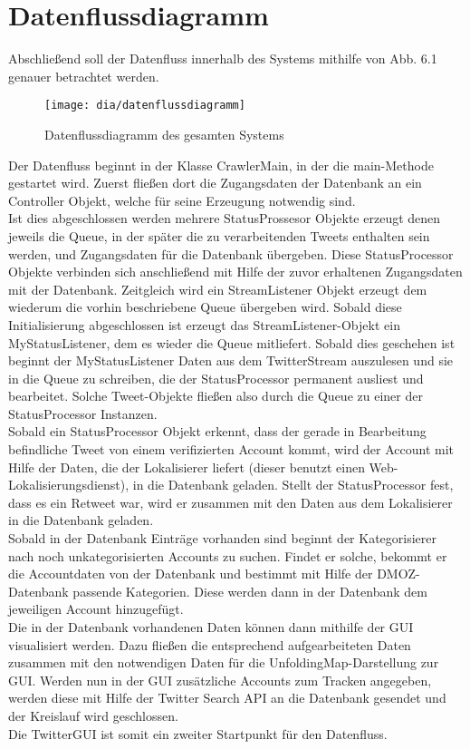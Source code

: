 \section{Datenflussdiagramm}
Abschließend soll der Datenfluss innerhalb des Systems mithilfe von Abb. 6.1 genauer betrachtet werden.

\begin{figure}[h!]
	\centering
	\texttt{[image: dia/datenflussdiagramm]}
	\caption{Datenflussdiagramm des gesamten Systems}
	\label{fig:datenflussdiagramm}
\end{figure}
Der Datenfluss beginnt in der Klasse CrawlerMain, in der die main-Methode gestartet wird. Zuerst fließen dort die Zugangsdaten der Datenbank an ein Controller Objekt, welche für seine Erzeugung notwendig sind. \\
Ist dies abgeschlossen werden mehrere StatusProssesor Objekte erzeugt denen jeweils die Queue, in der später die zu verarbeitenden Tweets enthalten sein werden, und Zugangsdaten für die Datenbank übergeben. Diese StatusProcessor Objekte verbinden sich anschließend mit Hilfe der zuvor erhaltenen Zugangsdaten mit der Datenbank. Zeitgleich wird ein StreamListener Objekt erzeugt dem wiederum die vorhin beschriebene Queue übergeben wird. Sobald diese Initialisierung abgeschlossen ist erzeugt das StreamListener-Objekt ein MyStatusListener, dem es wieder die Queue mitliefert. Sobald dies geschehen ist beginnt der MyStatusListener Daten aus dem TwitterStream auszulesen und sie in die Queue zu schreiben, die der StatusProcessor permanent ausliest und bearbeitet. Solche Tweet-Objekte fließen also durch die Queue zu einer der StatusProcessor Instanzen. \\
Sobald ein StatusProcessor Objekt erkennt, dass der gerade in Bearbeitung befindliche Tweet von einem verifizierten Account kommt, wird der Account mit Hilfe der Daten, die  der Lokalisierer liefert (dieser benutzt einen Web-Lokalisierungsdienst), in die Datenbank geladen. Stellt der StatusProcessor fest, dass es ein Retweet war, wird er zusammen mit den Daten aus dem Lokalisierer in die Datenbank geladen.\\
Sobald in der Datenbank Einträge vorhanden sind beginnt der Kategorisierer nach noch unkategorisierten Accounts zu suchen. Findet er solche, bekommt er die Accountdaten von der Datenbank und bestimmt mit Hilfe der DMOZ-Datenbank passende Kategorien. Diese werden dann in der Datenbank dem jeweiligen Account hinzugefügt.\\
Die in der Datenbank vorhandenen Daten können dann mithilfe der GUI visualisiert werden. Dazu fließen die entsprechend aufgearbeiteten Daten zusammen mit den notwendigen Daten für die UnfoldingMap-Darstellung zur GUI. Werden nun in der GUI zusätzliche Accounts zum Tracken angegeben, werden diese mit Hilfe der Twitter Search API an die Datenbank gesendet und der Kreislauf wird geschlossen.\\
Die TwitterGUI ist somit ein zweiter Startpunkt für den Datenfluss.	
